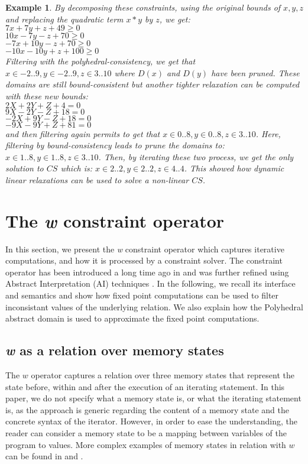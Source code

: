\documentclass[submission,copyright,creativecommons]{eptcs}
\newtheorem{example}{Example}
\begin{document}
\begin{example}
\noindent
By decomposing these constraints, using the original bounds of $x,y,z$ and 
replacing the quadratic term $x*y$ by $z$, we get:\\
$7x + 7y  +z +49   \geq 0$\\ 
$10x - 7y -z +70   \geq 0$\\
$-7x+10y  -z  +70  \geq 0$\\
$-10x -10y +z  +100 \geq 0$\\
Filtering with the polyhedral-consistency, we get that
$x \in -2 .. 9, y \in -2 .. 9, z \in 3 .. 10$ where $D(x)$ and $D(y)$ have been pruned.
These domains are still bound-consistent but 
another tighter relaxation can be computed with these new bounds:\\
$2X + 2Y  +Z + 4   = 0$\\
$9X -  2Y   -Z +18   = 0$\\
$-2X+  9Y  - Z +18   = 0$\\
$-9X -  9Y + Z  +81 = 0$\\
and then filtering again permits to get that
$x \in 0 .. 8, y \in 0 .. 8, z \in 3 .. 10$.
Here, filtering by bound-consistency leads to prune the domains to:
$x \in 1 .. 8, y \in 1 .. 8, z \in 3 .. 10$.
Then, by iterating these two process, we get the only solution to $CS$ which is:
$x \in 2 .. 2, y \in 2 .. 2, z \in 4 .. 4 $.
This showed how dynamic linear relaxations can be used to solve a non-linear $CS$.
\end{example}

\section{The \textit{w} constraint operator}

In this section, we present the {\it w} constraint operator which captures iterative computations, and how it is processed by a constraint solver. 
The constraint operator has been introduced a long time ago in \cite{GBR98,GBR00} and was further refined using Abstract Interpretation (AI) techniques \cite{DGD07a}. In the following, we recall its interface and semantics and show how fixed point computations can be used to filter 
inconsistant values of the underlying relation. We also explain
how the Polyhedral abstract domain is used to approximate the fixed point computations.

\subsection{\textit{w} as a relation over memory states}
The $w$ operator captures a relation over three memory states that represent the state before, within and after the execution of an iterating statement.
In this paper, we do not specify what a memory state is, or what the iterating statement is, as the approach is generic regarding the content of a memory state and the concrete syntax of the iterator. However, in order to ease the understanding, the reader can consider a memory state to be a mapping between variables of the program to values. More complex examples of memory states in relation with $w$ can be found in \cite{CBG09} and \cite{CG10}.
\end{document}
